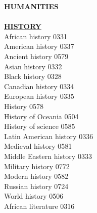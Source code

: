 \documentclass[9pt,twoside]{article}
\newcommand{\categoryheading}[1]{{\fontsize{8}{11}\selectfont \textbf{\uline{#1}}}}
\begin{document}
\begin{multicols}{3}
\textbf{HUMANITIES} \leavevmode \\
\leavevmode \\
\categoryheading{HISTORY} \leavevmode \\
African history \hfill 0331 \leavevmode \\
American history \hfill 0337 \leavevmode \\
Ancient history \hfill 0579 \leavevmode \\
Asian history \hfill 0332 \leavevmode \\
Black history \hfill 0328 \leavevmode \\
Canadian history \hfill 0334 \leavevmode \\
European history \hfill 0335 \leavevmode \\
History \hfill 0578 \leavevmode \\
History of Oceania \hfill 0504 \leavevmode \\
History of science \hfill 0585 \leavevmode \\
Latin American history \hfill 0336 \leavevmode \\
Medieval history \hfill 0581 \leavevmode \\
Middle Eastern history \hfill 0333 \leavevmode \\
Military history \hfill 0772 \leavevmode \\
Modern history \hfill 0582 \leavevmode \\
Russian history \hfill 0724 \leavevmode \\
World history \hfill 0506 \leavevmode \\
African literature \hfill 0316


\end{multicols}
\end{document}
